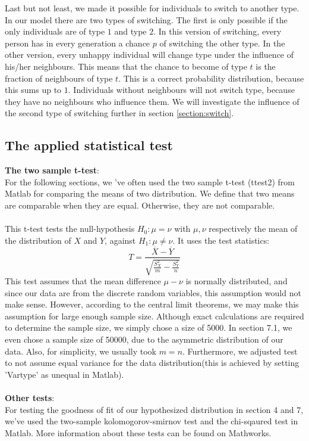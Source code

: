 Last but not least, we made it possible for individuals to switch to another type.
In our model there are two types of switching.
The first is only possible if the only individuals are of type $1$ and type $2$.
In this version of switching, every person has in every generation a chance $p$ of switching the other type.
In the other version, every unhappy individual will change type under the influence of his/her neighbours.
This means that the chance to become of type $t$ is the fraction of neighbours of type $t$.
This is a correct probability distribution, because this sums up to $1$.
Individuals without neighbours will not switch type, because they have no neighbours who influence them.
We will investigate the influence of the second type of switching further in section \ref{section:switch}.
\subsection{The applied statistical test}
\textbf{The two sample t-test}:\\
For the following sections, we 've often used the two sample t-test (ttest2) from Matlab for comparing the means of two distribution. We define that two means are comparable when they are equal. Otherwise, they are not comparable.\\
\\
This t-test tests the null-hypothesis $H_0:\mu=\nu$ with $\mu,\nu$ respectively the mean of the distribution of $X$ and $Y$, against $H_1:\mu\neq\nu$. It uses the test statistics:
 \[T=\frac{\overline{X}-\overline{Y}}{\sqrt{\frac{S^2_X}{m}-\frac{S^2_Y}{n}}}\]
This test assumes that the mean difference $\mu-\nu$ is normally distributed, and since our data are from the discrete random variables, this assumption would not make sense. 
However, according to the central limit theorems, we may make this assumption for large enough sample size. 
Although exact calculations are required to determine the sample size, we simply chose a size of 5000. In section 7.1, we even chose a sample size of 50000, due to the asymmetric distribution of our data. Also, for simplicity, we usually took $m=n$. Furthermore, we adjusted test to not assume equal variance for the data distribution(this is achieved by setting 'Vartype' as unequal in Matlab).\\
\\
\textbf{Other tests}:\\
For testing the goodness of fit of our hypothesized distribution in section 4 and 7, we've used the two-sample kolomogorov-smirnov test and the chi-sqaured test in Matlab. More information about these tests can be found on Mathworks.  


